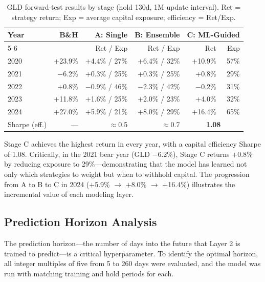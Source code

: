 \documentclass[11pt, letterpaper]{article}
\begin{document}
\begin{table}[h]
\centering
\caption{GLD forward-test results by stage (hold 130d, 1M update interval).
Ret = strategy return; Exp = average capital exposure; efficiency = Ret/Exp.}
\label{tab:stages}
\small
\begin{tabular}{lrrrrr}
\toprule
Year & B\&H & \textbf{A}: Single & \textbf{B}: Ensemble
     & \multicolumn{2}{c}{\textbf{C}: ML-Guided} \\
\cmidrule(lr){5-6}
     &      & Ret / Exp          & Ret / Exp
     & Ret & Exp \\
\midrule
2020 & $+$23.9\% & $+$4.4\% / 27\% & $+$6.4\% / 32\% & $+$10.9\% & 57\% \\
2021 & $-$6.2\%  & $+$0.3\% / 25\% & $+$0.3\% / 25\% & $+$0.8\%  & 29\% \\
2022 & $+$0.8\%  & $-$0.9\% / 46\% & $-$2.3\% / 42\% & $-$0.2\%  & 31\% \\
2023 & $+$11.8\% & $+$1.6\% / 25\% & $+$2.0\% / 23\% & $+$4.0\%  & 32\% \\
2024 & $+$27.0\% & $+$5.9\% / 21\% & $+$8.0\% / 29\% & $+$16.4\% & 65\% \\
\midrule
Sharpe (eff.) & --- & $\approx$0.5 & $\approx$0.7 & \multicolumn{2}{c}{\textbf{1.08}} \\
\bottomrule
\end{tabular}
\end{table}

Stage C achieves the highest return in every year, with a capital efficiency
Sharpe of 1.08. Critically, in the 2021 bear year (GLD $-$6.2\%), Stage C
returns $+$0.8\% by reducing exposure to 29\%---demonstrating that the model
has learned not only which strategies to weight but when to withhold capital.
The progression from A to B to C in 2024 ($+$5.9\% $\to$ $+$8.0\% $\to$
$+$16.4\%) illustrates the incremental value of each modeling layer.

\subsection{Prediction Horizon Analysis}

The prediction horizon---the number of days into the future that Layer 2 is
trained to predict---is a critical hyperparameter. To identify the optimal
horizon, all integer multiples of five from 5 to 260 days were evaluated, and
the model was run with matching training and hold periods for each.
\end{document}

